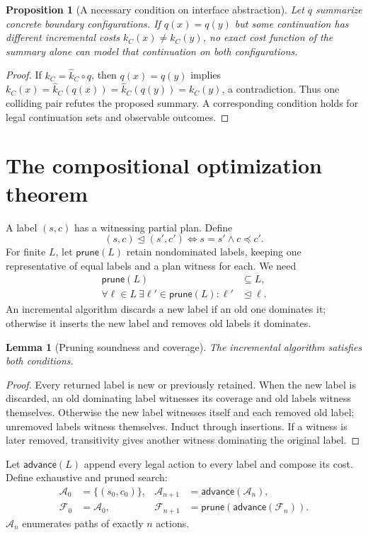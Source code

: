 \documentclass[11pt]{article}
\newtheorem{lemma}[theorem]{Lemma}
\newtheorem{proposition}[theorem]{Proposition}
\newcommand{\Front}{\mathcal F}
\newcommand{\All}{\mathcal A}
\begin{document}
\begin{proposition}[A necessary condition on interface abstraction]
Let $q$ summarize concrete boundary configurations. If $q(x)=q(y)$ but some continuation has different incremental costs $k_C(x)\ne k_C(y)$, no exact cost function of the summary alone can model that continuation on both configurations.
\end{proposition}
\begin{proof}
If $k_C=\widehat k_C\circ q$, then $q(x)=q(y)$ implies $k_C(x)=\widehat k_C(q(x))=\widehat k_C(q(y))=k_C(y)$, a contradiction. Thus one colliding pair refutes the proposed summary. A corresponding condition holds for legal continuation sets and observable outcomes.
\end{proof}

\section{The compositional optimization theorem}
A label $(s,c)$ has a witnessing partial plan. Define
\[
 (s,c)\trianglelefteq(s',c')
 \iff s=s'\land c\preceq c'.
\]
For finite $L$, let $\mathsf{prune}(L)$ retain nondominated labels, keeping one representative of equal labels and a plan witness for each. We need
\begin{align*}
 \mathsf{prune}(L)&\subseteq L,\\
 \forall\ell\in L\ \exists\ell'\in\mathsf{prune}(L):
 \ell'&\trianglelefteq\ell.
\end{align*}
An incremental algorithm discards a new label if an old one dominates it; otherwise it inserts the new label and removes old labels it dominates.

\begin{lemma}[Pruning soundness and coverage]
The incremental algorithm satisfies both conditions.
\end{lemma}
\begin{proof}
Every returned label is new or previously retained. When the new label is discarded, an old dominating label witnesses its coverage and old labels witness themselves. Otherwise the new label witnesses itself and each removed old label; unremoved labels witness themselves. Induct through insertions. If a witness is later removed, transitivity gives another witness dominating the original label.
\end{proof}

Let $\mathsf{advance}(L)$ append every legal action to every label and compose its cost. Define exhaustive and pruned search:
\begin{align*}
 \All_0&=\{(s_0,c_0)\},&
 \All_{n+1}&=\mathsf{advance}(\All_n),\\
 \Front_0&=\All_0,&
 \Front_{n+1}&=\mathsf{prune}(\mathsf{advance}(\Front_n)).
\end{align*}
$\All_n$ enumerates paths of exactly $n$ actions.
\end{document}

